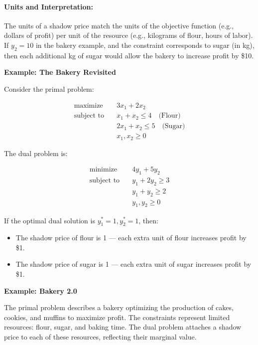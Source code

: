 \paragraph{Units and Interpretation:}
The units of a shadow price match the units of the objective function (e.g., dollars of profit) per unit of the resource (e.g., kilograms of flour, hours of labor). If $y_2 = 10$ in the bakery example, and the constraint corresponds to sugar (in kg), then each additional kg of sugar would allow the bakery to increase profit by \$10.

\vspace{1em}
\noindent\textbf{Example: The Bakery Revisited}

Consider the primal problem:

$$
\begin{aligned}
\text{maximize} \quad & 3x_1 + 2x_2 \\
\text{subject to} \quad
& x_1 + x_2 \leq 4 \quad \text{(Flour)} \\
& 2x_1 + x_2 \leq 5 \quad \text{(Sugar)} \\
& x_1, x_2 \geq 0
\end{aligned}
$$

The dual problem is:

$$
\begin{aligned}
\text{minimize} \quad & 4y_1 + 5y_2 \\
\text{subject to} \quad
& y_1 + 2y_2 \geq 3 \\
& y_1 + y_2 \geq 2 \\
& y_1, y_2 \geq 0
\end{aligned}
$$

If the optimal dual solution is $y_1^* = 1, y_2^* = 1$, then:

\begin{itemize}
\item The shadow price of flour is 1 — each extra unit of flour increases profit by \$1.
\item The shadow price of sugar is 1 — each extra unit of sugar increases profit by \$1.
\end{itemize}

\noindent \textbf{Example: Bakery 2.0}

The primal problem describes a bakery optimizing the production of cakes, cookies, and muffins to maximize profit. The constraints represent limited resources: flour, sugar, and baking time. The dual problem attaches a shadow price to each of these resources, reflecting their marginal value.

